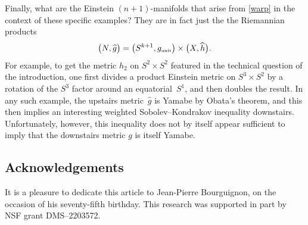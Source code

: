 \documentclass[10pt,a4paper]{amsart}
\numberwithin{equation}{section}
\begin{document}
Finally, what are the Einstein $(n+1)$-manifolds that arise from \eqref{warp} in the context of these specific examples? They are in fact just the
the Riemannian products
\begin{equation*}
\big(N, \widehat{g}\big)= \big(S^{k+1} , g_{\text{\tiny unit}}\big) \times \big(X, \widehat{h}\big).
\end{equation*}
For example, to get the metric $h_2$ on $S^2 \times S^2$ featured in the technical question of the introduction,
one first divides a product Einstein metric on $S^3 \times S^2$ by a rotation
of the $S^3$ factor around an equatorial~$S^1$, and then doubles the result. In any such example, the upstairs metric~$\widehat{g}$ is Yamabe by Obata's theorem,
and this then implies an interesting weighted Sobolev--Kondrakov inequality downstairs. Unfortunately, however, this inequality does not by itself appear sufficient to imply that the downstairs metric $g$ is itself Yamabe.

\subsection*{Acknowledgements}
It is a pleasure to dedicate this article to Jean-Pierre Bourguignon, on the occasion of
his seventy-fifth birthday. This research was supported in part by NSF grant DMS--2203572.

\end{document}
